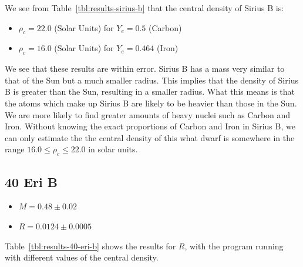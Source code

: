 \documentclass[a4paper]{IEEEtran}
\begin{document}
    We see from Table~\ref{tbl:results-sirius-b} that the central density of Sirius B is:
    \begin{itemize}
        \item $\rho_c = 22.0$ (Solar Units) for $Y_e = 0.5$ (Carbon)
        \item $\rho_c = 16.0$ (Solar Units) for $Y_e = 0.464$ (Iron)
    \end{itemize}

    We see that these results are within error. Sirius B has a mass very similar
    to that of the Sun but a much smaller radius. This implies that the density
    of Sirius B is greater than the Sun, resulting in a smaller radius.
    What this means is that the atoms which make up Sirius B are likely to
    be heavier than those in the Sun. We are more likely to find greater
    amounts of heavy nuclei such as Carbon and Iron.
    Without knowing the exact proportions of Carbon and Iron in Sirius B,
    we can only estimate the the central density of this what dwarf is
    somewhere in the range $16.0 \leq \rho_c \leq 22.0$ in solar units.

    \subsection{40 Eri B}

    \begin{itemize} 
        \item $M = 0.48 \pm 0.02 $
        \item $R = 0.0124 \pm 0.0005 $
    \end{itemize}

    Table~\ref{tbl:results-40-eri-b} shows the results for $R$, with the program running
    with different values of the central density.
\end{document}
